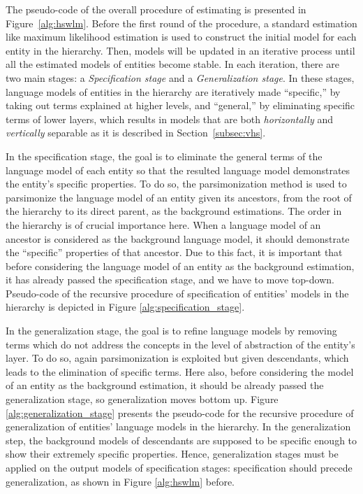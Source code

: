 The pseudo-code of the overall procedure of estimating \achswlm is presented in Figure~\ref{alg:hswlm}. 
Before the first round of the procedure, a standard estimation like maximum likelihood estimation is used to construct the initial model for each entity in the hierarchy. 
Then, models will be updated in an iterative process until all the estimated models of entities become stable. 
In each iteration, there are two main stages: a \emph{Specification stage} and a \emph{Generalization stage}. 
In these stages, language models of entities in the hierarchy are iteratively made ``specific,'' by taking out terms explained at higher levels, and ``general,'' by eliminating specific terms of lower layers, which results in models that are both \emph{horizontally} and \emph{vertically} separable as it is described in Section~\ref{subsec:vhs}.


In the specification stage, the goal is to eliminate the general terms of the language model of each entity so that the resulted language model demonstrates the entity's specific properties.  
To do so, the parsimonization method is used to parsimonize the language model of an entity given its ancestors, from the root of the hierarchy to its direct parent, as the background estimations. 
%
The order in the hierarchy is of crucial importance here. 
When a language model of an ancestor is considered as the background language model, it should demonstrate the ``specific'' properties of that ancestor. Due to this fact, it is important that before considering the language model of an entity as the background estimation, it has already passed the specification stage, and we have to move top-down.
Pseudo\:-\:code of the recursive procedure of specification of entities' models in the hierarchy is depicted in Figure \ref{alg:specification_stage}.


In the generalization stage, the goal is to refine language models by removing terms which do not address the concepts in the level of abstraction of the entity's layer.
To do so, again parsimonization is exploited but given descendants, which leads to the elimination of specific terms. 
Here also, before considering the model of an entity as the background estimation, it should be already passed the generalization stage, so generalization moves bottom up.
Figure \ref{alg:generalization_stage} presents the pseudo\:-\:code for the recursive procedure of generalization of entities' language models in the hierarchy. 
In the generalization step, the background models of descendants are supposed to be specific enough to show their extremely specific properties. Hence, generalization stages must be applied on the output models of specification stages: specification should precede generalization, as shown in Figure \ref{alg:hswlm} before.
